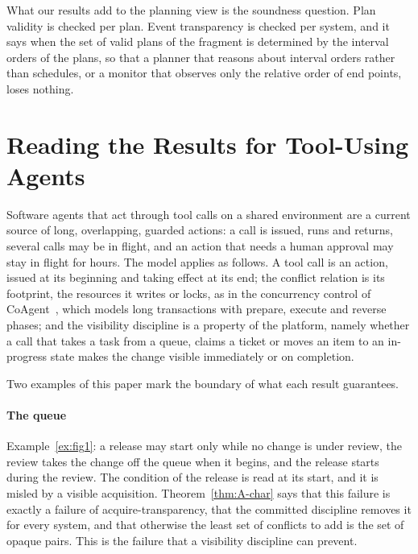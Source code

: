 \documentclass[preprint,12pt]{elsarticle}
\theoremstyle{plain}
\theoremstyle{definition}
\begin{document}
What our results add to the planning view is the soundness question. Plan validity is checked per plan. Event transparency is checked per system, and it says when the set of valid plans of the fragment is determined by the interval orders of the plans, so that a planner that reasons about interval orders rather than schedules, or a monitor that observes only the relative order of end points, loses nothing.

\section{Reading the Results for Tool-Using Agents}
\label{sec:agents}

Software agents that act through tool calls on a shared environment are a current source of long, overlapping, guarded actions: a call is issued, runs and returns, several calls may be in flight, and an action that needs a human approval may stay in flight for hours. The model applies as follows. A tool call is an action, issued at its beginning and taking effect at its end; the conflict relation is its footprint, the resources it writes or locks, as in the concurrency control of CoAgent~\cite{LyuEtAl2026CoAgent}, which models long transactions with prepare, execute and reverse phases; and the visibility discipline is a property of the platform, namely whether a call that takes a task from a queue, claims a ticket or moves an item to an in-progress state makes the change visible immediately or on completion.

Two examples of this paper mark the boundary of what each result guarantees.

\paragraph{The queue}
Example~\ref{ex:fig1}: a release may start only while no change is under review, the review takes the change off the queue when it begins, and the release starts during the review. The condition of the release is read at its start, and it is misled by a visible acquisition. Theorem~\ref{thm:A-char} says that this failure is exactly a failure of acquire-transparency, that the committed discipline removes it for every system, and that otherwise the least set of conflicts to add is the set of opaque pairs. This is the failure that a visibility discipline can prevent.
\end{document}
